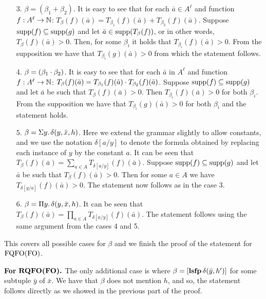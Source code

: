\begin{itemize}
\item[3.] $\beta = (\beta_1 + \beta_2)$. It is easy to see that for each $\bar{a} \in A^{\ell}$ and function $f:A^{\ell}\to\mathbb{N}$: $T_{\beta}(f)(\bar{a}) = T_{\beta_1}(f)(\bar{a}) + T_{\beta_2}(f)(\bar{a})$. Suppose $\text{\rm supp}(f)\subseteq\text{\rm supp}(g)$ and let $\bar{a} \in \text{\rm supp}(T_{\beta}(f))$, or in other words, $T_{\beta}(f)(\bar{a}) > 0$. Then, for some $\beta_i$ it holds that $T_{\beta_i}(f)(\bar{a}) > 0$. From the supposition we have that $T_{\beta_i}(g)(\bar{a}) > 0$ from which the statement follows.
\item[4.] $\beta = (\beta_1 \cdot \beta_2)$. It is easy to see that for each $\bar{a}$ in $A^{\ell}$ and function $f:A^{\ell}\to\mathbb{N}$: $T_{\beta}(f)(\bar{a}) = T_{\beta_1}(f)(\bar{a}) \cdot T_{\beta_2}(f)(\bar{a})$. Suppose $\text{\rm supp}(f)\subseteq\text{\rm supp}(g)$ and let $\bar{a}$ be such that $T_{\beta}(f)(\bar{a}) > 0$. Then $T_{\beta_i}(f)(\bar{a}) > 0$ for both $\beta_i$. From the supposition we have that $T_{\beta_i}(g)(\bar{a}) > 0$ for both $\beta_i$ and the statement holds.
\item[5.] $\beta = \Sigma{y}.\,\delta(y,\bar{x},h)$. Here we extend the grammar slightly to allow constants, and we use the notation $\delta[a/y]$ to denote the formula obtained by replacing each instance of $y$ by the constant $a$. It can be seen that $T_{\beta}(f)(\bar{a}) = \sum_{a \in A} T_{\delta[a/y]}(f)(\bar{a})$. Suppose $\text{\rm supp}(f)\subseteq\text{\rm supp}(g)$ and let $\bar{a}$ be such that $T_{\beta}(f)(\bar{a}) > 0$. Then for some $a\in A$ we have $T_{\delta[y/a]}(f)(\bar{a}) > 0$. The statement now follows as in the case 3.
\item[6.] $\beta = \Pi{y}.\,\delta(y,\bar{x},h)$. 
It can be seen that $T_{\beta}(f)(\bar{a}) = \prod_{a \in A} T_{\delta[a/y]}(f)(\bar{a})$. 
The statement follows using the same argument from the cases 4 and 5.
\end{itemize}
This covers all possible cases for $\beta$ and we finish the proof of the statement for ${\rm FQFO}({\rm FO})$.

\vspace{1em}
{\bf For} $\boldsymbol{{\rm RQFO}({\rm FO}).}$ The only additional case is where $\beta = [{\bf lsfp} \, \delta(\bar{y},h')]$ for some subtuple $\bar{y}$ of $\bar{x}$. We have that $\beta$ does not mention $h$, and so, the statement follows directly as we showed in the previous part of the proof.


